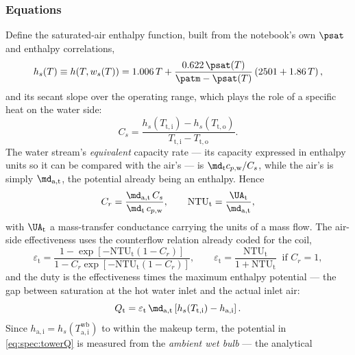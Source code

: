 \subsubsection{Equations}
Define the saturated-air enthalpy function, built from the notebook's own $\psat$ and enthalpy
correlations,
\begin{equation}
h_{s}(T) \equiv h\!\left(T,w_{s}(T)\right)
= 1.006\,T + \frac{0.622\,\psat(T)}{\patm-\psat(T)}\left(2501+1.86\,T\right) ,
\label{eq:spec:hsat}
\end{equation}
and its secant slope over the operating range, which plays the role of a specific heat on the water
side:
\begin{equation}
C_{s} = \frac{h_{s}(T_{\mathrm{t,i}}) - h_{s}(T_{\mathrm{t,o}})}
             {T_{\mathrm{t,i}} - T_{\mathrm{t,o}}} .
\label{eq:spec:Cs}
\end{equation}
The water stream's \emph{equivalent} capacity rate --- its capacity expressed in enthalpy units so it
can be compared with the air's --- is $\md_{\mathrm{t}}c_{p,\mathrm{w}}/C_{s}$, while the air's is
simply $\md_{\mathrm{a,t}}$, the potential already being an enthalpy. Hence
\begin{equation}
C_{r} = \frac{\md_{\mathrm{a,t}}\,C_{s}}{\md_{\mathrm{t}}\,c_{p,\mathrm{w}}} ,
\qquad
\mathrm{NTU}_{\mathrm{t}} = \frac{\UA_{\mathrm{t}}}{\md_{\mathrm{a,t}}} ,
\label{eq:spec:towerNTU}
\end{equation}
with $\UA_{\mathrm{t}}$ a mass-transfer conductance carrying the units of a mass flow. The air-side
effectiveness uses the counterflow relation already coded for the coil,
\begin{equation}
\varepsilon_{\mathrm{t}} =
\frac{1-\exp\!\left[-\mathrm{NTU}_{\mathrm{t}}(1-C_{r})\right]}
     {1-C_{r}\exp\!\left[-\mathrm{NTU}_{\mathrm{t}}(1-C_{r})\right]} ,
\qquad
\varepsilon_{\mathrm{t}} = \frac{\mathrm{NTU}_{\mathrm{t}}}{1+\mathrm{NTU}_{\mathrm{t}}}
\ \text{ if } C_{r}=1 ,
\label{eq:spec:towereps}
\end{equation}
and the duty is the effectiveness times the maximum enthalpy potential --- the gap between saturation
at the hot water inlet and the actual inlet air:
\begin{equation}
Q_{\mathrm{t}} = \varepsilon_{\mathrm{t}}\,\md_{\mathrm{a,t}}
\left[h_{s}(T_{\mathrm{t,i}}) - h_{\mathrm{a,i}}\right] .
\label{eq:spec:towerQ}
\end{equation}
Since $h_{\mathrm{a,i}} = h_{s}(T_{\mathrm{a,i}}^{\mathrm{wb}})$ to within the makeup term, the
potential in \eqref{eq:spec:towerQ} is measured from the \emph{ambient wet bulb} --- the analytical
